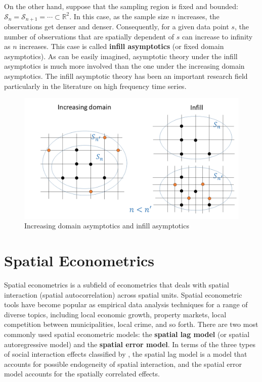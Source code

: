 \documentclass[10.5pt, A4paper, openany, uplatex]{book}
\newcommand{\mcl}{\mathcal}
\newcommand{\mbb}{\mathbb}
\numberwithin{equation}{section}
\begin{document}
On the other hand, suppose that the sampling region is fixed and bounded:  $\mcl{S}_n = \mcl{S}_{n + 1}  = \cdots \subset \mbb{R}^2$.
In this case, as the sample size $n$ increases, the observations get denser and denser.
Consequently, for a given data point $s$, the number of observations that are spatially dependent of $s$ can increase to infinity as $n$ increases.
This case is called \textbf{infill asymptotics} (or fixed domain asymptotics).
As can be easily imagined, asymptotic theory under the infill asymptotics is much more involved than the one under the increasing domain asymptotics.
The infill asymptotic theory has been an important research field particularly in the literature on high frequency time series.

\begin{figure}[h!]
	\begin{center}
		\includegraphics[width = 12cm]{asymptotics.png}
		\caption{Increasing domain asymptotics and infill asymptotics}
	\end{center}
\end{figure}

\chapter{Spatial Econometrics}\label{chap:spatial_econometrics}

Spatial econometrics is a subfield of econometrics that deals with spatial interaction (spatial autocorrelation) across spatial units.
Spatial econometric tools have become popular as empirical data analysis techniques for a range of diverse topics, including local economic growth, property markets, local competition between municipalities, local crime, and so forth. 
There are two most commonly used spatial econometric models: the \textbf{spatial lag model} (or spatial autoregressive model) and the \textbf{spatial error model}.
In terms of the three types of social interaction effects classified by \cite{manski1993identification}, the spatial lag model is a model that accounts for possible endogeneity of spatial interaction, and the spatial error model accounts for the spatially correlated effects.
\end{document}
